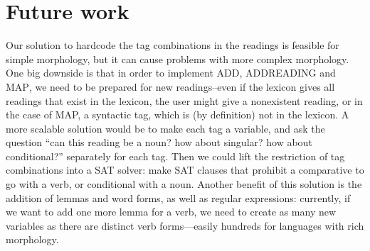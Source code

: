 




\section{Future work}


Our solution to hardcode the tag combinations in the readings is feasible for simple morphology, but it can cause problems with more complex morphology. One big downside is that in order to implement \textsc{ADD}, \textsc{ADDREADING} and \textsc{MAP}, we need to be prepared for new readings--even if the lexicon gives all readings that exist in the lexicon, the user might give a nonexistent reading, or in the case of MAP, a syntactic tag, which is (by definition) not in the lexicon. A more scalable solution would be to make each tag a variable, and ask the question ``can this reading be a noun? how about singular? how about conditional?'' separately for each tag. Then we could lift the restriction of tag combinations into a SAT solver: make SAT clauses that prohibit a comparative to go with a verb, or conditional with a noun.
Another benefit of this solution is the addition of lemmas and word forms, as well as regular expressions: currently, if we want to add one more lemma for a verb, we need to create as many new variables as there are distinct verb forms---easily hundreds for languages with rich morphology.


